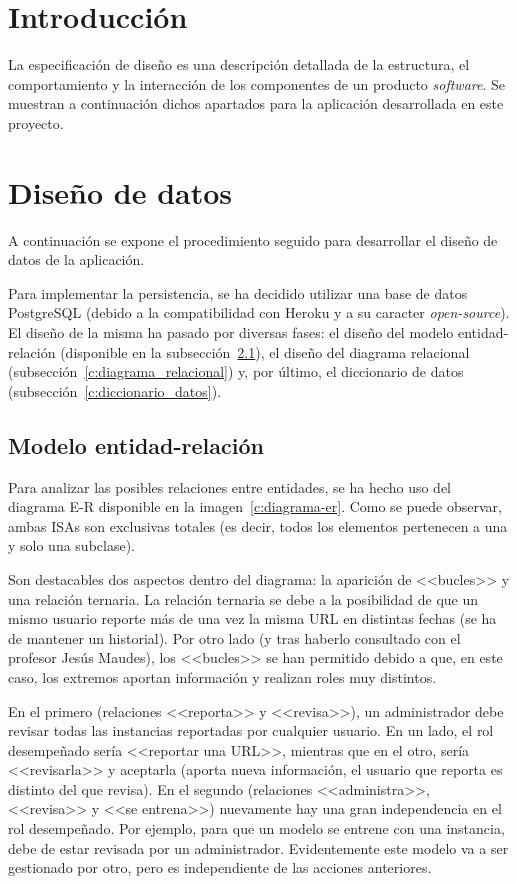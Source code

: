 
\section{Introducción}

La especificación de diseño es una descripción detallada de la estructura, el comportamiento y la interacción de los componentes de un producto \textit{software}. Se muestran a continuación dichos apartados para la aplicación desarrollada en este proyecto.

\section{Diseño de datos}
\label{s:diseno-datos}
A continuación se expone el procedimiento seguido para desarrollar el diseño de datos de la aplicación.

Para implementar la persistencia, se ha decidido utilizar una base de datos PostgreSQL (debido a la compatibilidad con Heroku y a su caracter \textit{open-source}). El diseño de la misma ha pasado por diversas fases: el diseño del modelo entidad-relación (disponible en la subsección~\ref{c:diagrama_entidad_relacion}), el diseño del diagrama relacional (subsección~\ref{c:diagrama_relacional}) y, por último, el diccionario de datos (subsección~\ref{c:diccionario_datos}).


\subsection{Modelo entidad-relación}
\label{c:diagrama_entidad_relacion}

Para analizar las posibles relaciones entre entidades, se ha hecho uso del diagrama E-R disponible en la imagen~\ref{c:diagrama-er}. Como se puede observar, ambas ISAs son exclusivas totales (es decir, todos los elementos pertenecen a una y solo una subclase).

Son destacables dos aspectos dentro del diagrama: la aparición de <<bucles>> y una relación ternaria. La relación ternaria se debe a la posibilidad de que un mismo usuario reporte más de una vez la misma URL en distintas fechas (se ha de mantener un historial). Por otro lado (y tras haberlo consultado con el profesor Jesús Maudes), los <<bucles>> se han permitido debido a que, en este caso, los extremos aportan información y realizan roles muy distintos.

En el primero (relaciones <<reporta>> y <<revisa>>), un administrador debe revisar todas las instancias reportadas por cualquier usuario. En un lado, el rol desempeñado sería <<reportar una URL>>, mientras que en el otro, sería <<revisarla>> y aceptarla (aporta nueva información, el usuario que reporta es distinto del que revisa). En el segundo (relaciones <<administra>>, <<revisa>> y <<se entrena>>) nuevamente hay una gran independencia en el rol desempeñado. Por ejemplo, para que un modelo se entrene con una instancia, debe de estar revisada por un administrador. Evidentemente este modelo va a ser gestionado por otro, pero es independiente de las acciones anteriores.

